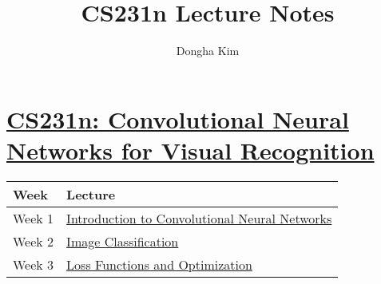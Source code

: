 \documentclass[10pt]{article}
\begin{document}
    
    \title{CS231n Lecture Notes}
    \author{Dongha Kim}
    \date{}
    \maketitle
    
    \hypertarget{cs231n-convolutional-neural-networks-for-visual-recognition}{%
\section*{\texorpdfstring{\href{http://cs231n.stanford.edu}{CS231n:
Convolutional Neural Networks for Visual
Recognition}}{CS231n: Convolutional Neural Networks for Visual Recognition}}\label{cs231n-convolutional-neural-networks-for-visual-recognition}}

\begin{longtable}[]{@{}ll@{}}
\toprule
\begin{minipage}[b]{0.47\columnwidth}\raggedright
Week\strut
\end{minipage} & \begin{minipage}[b]{0.47\columnwidth}\raggedright
Lecture\strut
\end{minipage}\tabularnewline
\midrule
\endhead
\begin{minipage}[t]{0.47\columnwidth}\raggedright
Week 1\strut
\end{minipage} & \begin{minipage}[t]{0.47\columnwidth}\raggedright
\href{https://github.com/kdha0727/CS231N/blob/master/Lecture\%2001\%20Introduction\%20to\%20CNN.pdf}{Introduction
to Convolutional Neural Networks}\strut
\end{minipage}\tabularnewline
\begin{minipage}[t]{0.47\columnwidth}\raggedright
Week 2\strut
\end{minipage} & \begin{minipage}[t]{0.47\columnwidth}\raggedright
\href{https://github.com/kdha0727/CS231N/blob/master/Lecture\%2002\%20Image\%20Classification.pdf}{Image
Classification}\strut
\end{minipage}\tabularnewline
\begin{minipage}[t]{0.47\columnwidth}\raggedright
Week 3\strut
\end{minipage} & \begin{minipage}[t]{0.47\columnwidth}\raggedright
\href{https://github.com/kdha0727/CS231N/blob/master/Lecture\%2003\%20Loss\%20Function\%20and\%20Optimization.pdf}{Loss
Functions and Optimization}\strut
\end{minipage}\tabularnewline

\end{longtable}
\end{document}
